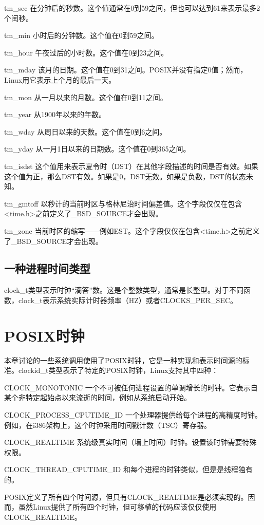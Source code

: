 \begin{eqlist*}
\item [tm\_sec]
在分钟后的秒数。这个值通常在0到59之间，但也可以达到61来表示最多2个闰秒。
\item [tm\_min]
小时后的分钟数。这个值在0到59之间。 
\item [tm\_hour]
午夜过后的小时数。这个值在0到23之间。 
\item [tm\_mday]
该月的日期。这个值在0到31之间。POSIX并没有指定0值；然而，Linux用它表示上个月的最后一天。 
\item [tm\_mon]
从一月以来的月数。这个值在0到11之间。
\item [tm\_year]
从1900年以来的年数。
\item [tm\_wday]
从周日以来的天数。这个值在0到6之间。
\item [tm\_yday]
从一月1日以来的日期数。这个值在0到365之间。
\item [tm\_isdst]
这个值用来表示夏令时（DST）在其他字段描述的时间是否有效。如果这个值为正，那么DST有效。如果是0，DST无效。如果是负数，DST的状态未知。
\item [tm\_gmtoff]
以秒计的当前时区与格林尼治时间偏差值。这个字段仅仅在包含<time.h>之前定义了\_BSD\_SOURCE才会出现。
\item [tm\_zone]
当前时区的缩写——例如EST。这个字段仅仅在包含<time.h>之前定义了\_BSD\_SOURCE才会出现。 
\end{eqlist*}

\subsection{一种进程时间类型}

clock\_t类型表示时钟“滴答”数。这是个整数类型，通常是长整型。对于不同函数，clock\_t表示系统实际计时器频率（HZ）或者CLOCKS\_PER\_SEC。

\section{POSIX时钟}

本章讨论的一些系统调用使用了POSIX时钟，它是一种实现和表示时间源的标准。clockid\_t类型表示了特定的POSIX时钟，Linux支持其中四种：

\begin{eqlist*}
\item [CLOCK\_MONOTONIC]
一个不可被任何进程设置的单调增长的时钟。它表示自某个非特定起始点以来流逝的时间，例如从系统启动开始。
\item [CLOCK\_PROCESS\_CPUTIME\_ID]
一个处理器提供给每个进程的高精度时钟。例如，在i386架构上，这个时钟采用时间戳计数（TSC）寄存器。
\item [CLOCK\_REALTIME]
系统级真实时间（墙上时间）时钟。设置该时钟需要特殊权限。
\item [CLOCK\_THREAD\_CPUTIME\_ID]
和每个进程的时钟类似，但是是线程独有的。
\end{eqlist*}
POSIX定义了所有四个时间源，但只有CLOCK\_REALTIME是必须实现的。因而，虽然Linux提供了所有四个时钟，但可移植的代码应该仅仅使用CLOCK\_REALTIME。 

